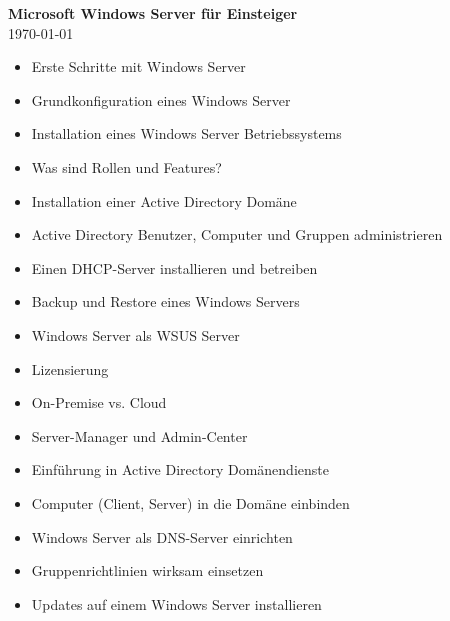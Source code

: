 \documentclass[11pt,paper=a4,fleqn,parskip=half]{scrartcl}
\title{\titel}
\newcommand{\titel}{Microsoft Windows Server für Einsteiger}
\newcommand{\datum}{\today}
\begin{document}

\begin{center}
	\textbf{\Large \titel}\\%
        \vspace{0.4em}
        \datum
\end{center}


\begin{itemize}[label=\checkmark] %
    \item Erste Schritte mit Windows Server
    \item Grundkonfiguration eines Windows Server
    \item Installation eines Windows Server Betriebssystems
    \item Was sind Rollen und Features?
    \item Installation einer Active Directory Domäne
    \item Active Directory Benutzer, Computer und Gruppen administrieren
    \item Einen DHCP-Server installieren und betreiben
    \item Backup und Restore eines Windows Servers
    \item Windows Server als WSUS Server
    \item Lizensierung
    \item On-Premise vs. Cloud
    \item Server-Manager und Admin-Center
    \item Einführung in Active Directory Domänendienste
    \item Computer (Client, Server) in die Domäne einbinden
    \item Windows Server als DNS-Server einrichten
    \item Gruppenrichtlinien wirksam einsetzen
    \item Updates auf einem Windows Server installieren
\end{itemize}


	

\end{document}

